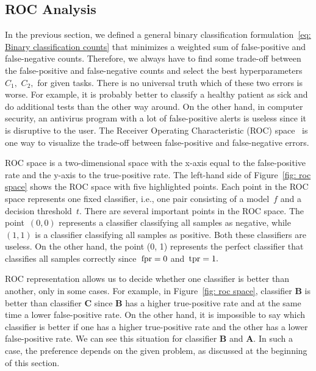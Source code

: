 \subsection{ROC Analysis}\label{subsec: ROC}

In the previous section, we defined a general binary classification formulation~\eqref{eq: Binary classification counts} that minimizes a weighted sum of false-positive and false-negative counts. Therefore, we always have to find some trade-off between the false-positive and false-negative counts and select the best hyperparameters~$C_1,$ $C_2,$ for given tasks. There is no universal truth which of these two errors is worse. For example, it is probably better to classify a healthy patient as sick and do additional tests than the other way around. On the other hand, in computer security, an antivirus program with a lot of false-positive alerts is useless since it is disruptive to the user. The Receiver Operating Characteristic (ROC) space~\cite{egan1975signal, fawcett2006introduction} is one way to visualize the trade-off between false-positive and false-negative errors.

ROC space is a two-dimensional space with the x-axis equal to the false-positive rate and the y-axis to the true-positive rate. The left-hand side of Figure~\ref{fig: roc space} shows the ROC space with five highlighted points. Each point in the ROC space represents one fixed classifier, i.e., one pair consisting of a model~$f$ and a decision threshold~$t.$ There are several important points in the ROC space. The point~$(0, 0)$ represents a classifier classifying all samples as negative, while~$(1, 1)$ is a classifier classifying all samples as positive. Both these classifiers are useless. On the other hand, the point (0, 1) represents the perfect classifier that classifies all samples correctly since~$\operatorname{fpr} = 0$ and~$\operatorname{tpr} = 1.$

ROC representation allows us to decide whether one classifier is better than another, only in some cases. For example, in Figure~\ref{fig: roc space}, classifier \textbf{B} is better than classifier \textbf{C} since \textbf{B} has a higher true-positive rate and at the same time a lower false-positive rate. On the other hand, it is impossible to say which classifier is better if one has a higher true-positive rate and the other has a lower false-positive rate. We can see this situation for classifier \textbf{B} and \textbf{A}. In such a case, the preference depends on the given problem, as discussed at the beginning of this section.

